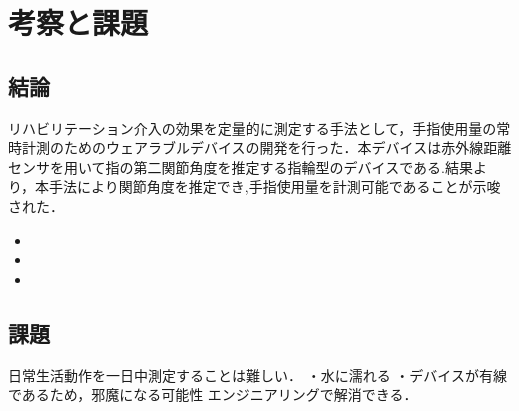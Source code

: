 \chapter{考察と課題}

\section{結論}
リハビリテーション介入の効果を定量的に測定する手法として，手指使用量の常時計測のためのウェアラブルデバイスの開発を行った．本デバイスは赤外線距離センサを用いて指の第二関節角度を推定する指輪型のデバイスである.結果より，本手法により関節角度を推定でき,手指使用量を計測可能であることが示唆された．


\begin{itemize}
 \item 
 \item 
 \item 
\end{itemize}


\section{課題}
日常生活動作を一日中測定することは難しい．
・水に濡れる
・デバイスが有線であるため，邪魔になる可能性
エンジニアリングで解消できる．
